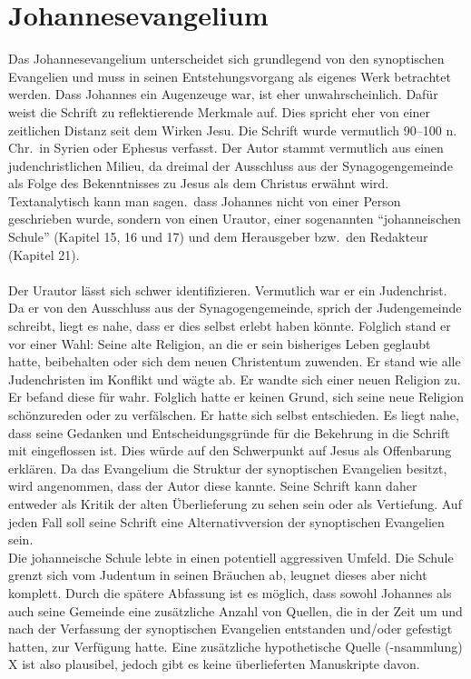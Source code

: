 \section{Johannesevangelium}
Das Johannesevangelium unterscheidet sich grundlegend von den synoptischen Evangelien und muss in seinen Entstehungsvorgang als eigenes Werk betrachtet werden. Dass Johannes ein Augenzeuge war, ist eher unwahrscheinlich. Dafür weist die Schrift zu reflektierende Merkmale auf. Dies spricht eher von einer zeitlichen Distanz seit dem Wirken Jesu. Die Schrift wurde vermutlich 90--100 n. Chr.\ in Syrien oder Ephesus verfasst. Der Autor stammt vermutlich aus einen judenchristlichen Milieu, da dreimal der Ausschluss aus der Synagogengemeinde als Folge des Bekenntnisses zu Jesus als dem Christus erwähnt wird. Textanalytisch kann man sagen.\ dass Johannes nicht von einer Person geschrieben wurde, sondern von einen Urautor, einer sogenannten ``johanneischen Schule'' (Kapitel 15, 16 und 17) und dem Herausgeber bzw.\ den Redakteur (Kapitel 21).
\\~\\
Der Urautor lässt sich schwer identifizieren. Vermutlich war er ein Judenchrist. Da er von den Ausschluss aus der Synagogengemeinde, sprich der Judengemeinde schreibt, liegt es nahe, dass er dies selbst erlebt haben könnte. Folglich stand er vor einer Wahl: Seine alte Religion, an die er sein bisheriges Leben geglaubt hatte, beibehalten oder sich dem neuen Christentum zuwenden. Er stand wie alle Judenchristen im Konflikt und wägte ab. Er wandte sich einer neuen Religion zu. Er befand diese für wahr. Folglich hatte er keinen Grund, sich seine neue Religion schönzureden oder zu verfälschen. Er hatte sich selbst entschieden. Es liegt nahe, dass seine Gedanken und Entscheidungsgründe für die Bekehrung in die Schrift mit eingeflossen ist. Dies würde auf den Schwerpunkt auf Jesus als Offenbarung erklären. Da das Evangelium die Struktur der synoptischen Evangelien besitzt, wird angenommen, dass der Autor diese kannte. Seine Schrift kann daher entweder als Kritik der alten Überlieferung zu sehen sein oder als Vertiefung. Auf jeden Fall soll seine Schrift eine Alternativversion der synoptischen Evangelien sein.
\\
Die johanneische Schule lebte in einen potentiell aggressiven Umfeld. Die Schule grenzt sich vom Judentum in seinen Bräuchen ab, leugnet dieses aber nicht komplett. Durch die spätere Abfassung ist es möglich, dass sowohl Johannes als auch seine Gemeinde eine zusätzliche Anzahl von Quellen, die in der Zeit um und nach der Verfassung der synoptischen Evangelien entstanden und/oder gefestigt hatten, zur Verfügung hatte. Eine zusätzliche hypothetische Quelle (-nsammlung) X ist also plausibel, jedoch gibt es keine überlieferten Manuskripte davon.
